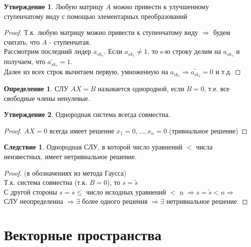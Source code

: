 \documentclass[a4paper, 12pt]{article}
\theoremstyle{definition}
\newtheorem*{definition}{Определение}
\newtheorem*{consequense}{Следствие}%
\newtheorem*{subtheorem}{Утверждение}
\begin{document}
  \begin{subtheorem}
    Любую матрицу $A$  можно привести к улучшенному ступенчатому виду с помощью элементарных преобразований 
  \end{subtheorem} 
  \begin{proof}
    Т.к. любую матрицу можно привести к ступенчатому виду $\Longrightarrow$ будем считать, что $A$ - ступенчатая. \\
    Рассмотрим последний лидер $a_{sk_s}$. Если $a_{sk_s} \neq 1$, то s-ю строку делим на $a_{sk_s}$ и получаем, что $\widetilde{a_{sk_s}}=1$. \\ Далее из всех строк вычитаем первую, умноженную на $a_{ik_s} \Longrightarrow \widetilde{a_{ik_s}}  =0$ и т.д. 
  \end{proof} 

  \begin{definition}
    СЛУ $AX=B$ называется однородной, если $B=0$, т.е. все свободные члены ненулевые.  
  \end{definition} 
  \begin{subtheorem}
    Однородная система всегда совместна.
  \end{subtheorem} 
  \begin{proof}
    $AX=0$ всегда имеет решение $x_1=0,...,x_n=0$ (тривиальное решение)
  \end{proof} 
  \begin{consequense}
    Однородная СЛУ, в которой число уравнений $<$ числа неизвестных, имеет нетривиальное решение.  
  \end{consequense} 
  \begin{proof}
    (в обозначениях из метода Гаусса)\\
    Т.к. система совместна (т.к. $B=0$), то $s=\widetilde{s}$ \\
    С другой стороны $s=\overline{s} \leq$ число исходных уравнений $<$ n $\Longrightarrow s=\widetilde{s} < n \Longrightarrow$ СЛУ неопределенна $\Longrightarrow \exists$ более одного решения $\Longrightarrow \exists$ нетривиальное решение.     
  \end{proof} 
  \newpage
  \section{Векторные пространства}
\end{document}
